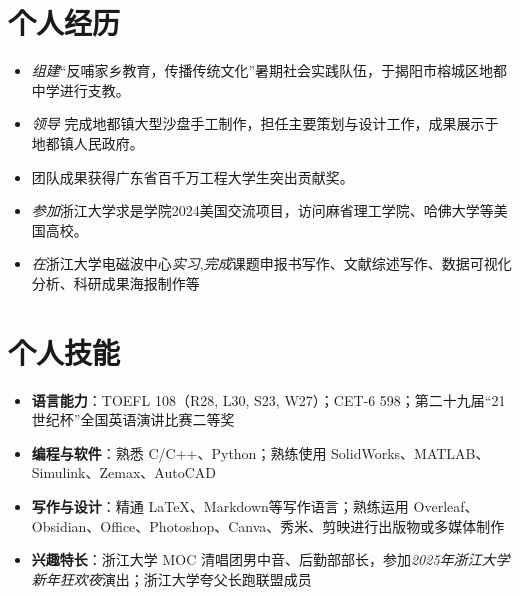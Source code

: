 \documentclass{resume}
\begin{document}

\section{个人经历}



\begin{itemize}[parsep=0.5ex]
 \item \textit{组建}“反哺家乡教育，传播传统文化”暑期社会实践队伍，于揭阳市榕城区地都中学进行支教。
 \item \textit{领导} 完成地都镇大型沙盘手工制作，担任主要策划与设计工作，成果展示于地都镇人民政府。
 \item 团队成果获得广东省百千万工程大学生突出贡献奖。
\end{itemize}



\begin{itemize}[parsep=0.5ex]
\item \textit{参加}浙江大学求是学院2024美国交流项目，访问麻省理工学院、哈佛大学等美国高校。
\end{itemize}

\begin{itemize}[parsep=0.5ex]
  \item \textit{在}浙江大学电磁波中心\textit{实习},\textit{完成}课题申报书写作、文献综述写作、数据可视化分析、科研成果海报制作等
\end{itemize}


\section{个人技能}
\begin{itemize}[parsep=0.5ex]
  \item \textbf{语言能力}：TOEFL 108（R28, L30, S23, W27）；CET-6 598；第二十九届“21世纪杯”全国英语演讲比赛二等奖
  \item \textbf{编程与软件}：熟悉 C/C++、Python；熟练使用 SolidWorks、MATLAB、Simulink、Zemax、AutoCAD
  \item \textbf{写作与设计}：精通 LaTeX、Markdown等写作语言；熟练运用 Overleaf、Obsidian、Office、Photoshop、Canva、秀米、剪映进行出版物或多媒体制作
  \item \textbf{兴趣特长}：浙江大学 MOC 清唱团男中音、后勤部部长，参加\textit{2025年浙江大学新年狂欢夜}演出；浙江大学夸父长跑联盟成员
\end{itemize}
\end{document}
